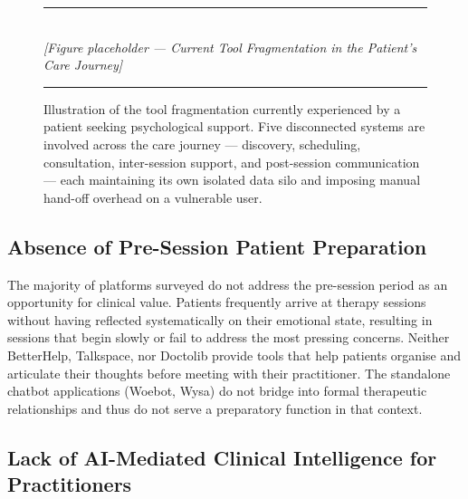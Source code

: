 \begin{figure}[H]
  \centering
  \rule{0.85\textwidth}{0.4pt}\\[6pt]
  {\small\itshape [Figure placeholder — Current Tool Fragmentation in the Patient's Care Journey]}
  \rule{0.85\textwidth}{0.4pt}
  \caption{Illustration of the tool fragmentation currently experienced by a
           patient seeking psychological support. Five disconnected systems are
           involved across the care journey — discovery, scheduling, consultation,
           inter-session support, and post-session communication — each
           maintaining its own isolated data silo and imposing manual
           hand-off overhead on a vulnerable user.}
  \label{fig:fragmentation}
\end{figure}

\subsection{Absence of Pre-Session Patient Preparation}

The majority of platforms surveyed do not address the pre-session period as an
opportunity for clinical value. Patients frequently arrive at therapy sessions
without having reflected systematically on their emotional state, resulting in
sessions that begin slowly or fail to address the most pressing concerns. Neither
BetterHelp, Talkspace, nor Doctolib provide tools that help patients organise
and articulate their thoughts before meeting with their practitioner. The
standalone chatbot applications (Woebot, Wysa) do not bridge into formal
therapeutic relationships and thus do not serve a preparatory function in that
context.

\subsection{Lack of AI-Mediated Clinical Intelligence for Practitioners}

